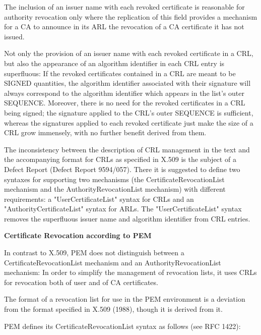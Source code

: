 The inclusion of an issuer name with each revoked certificate is
reasonable for authority revocation only where the replication of this
field provides a mechanism for a CA to announce in its ARL the revocation
of a CA certificate it has not issued.

Not only the provision of an issuer name with each revoked certificate
in a CRL, but also the appearance of an algorithm identifier in each
CRL entry is superfluous: If the revoked certificates contained in a CRL
are meant to be SIGNED quantities, the algorithm identifier associated
with their signature will always correspond to the algorithm identifier
which appears in the list's outer SEQUENCE.
Moreover, there is no need for the revoked certificates in a CRL being
signed; the signature applied to the CRL's outer SEQUENCE is sufficient,
whereas the signatures applied to each revoked certificate just make the
size of a CRL grow immensely, with no further benefit derived from them.

The inconsistency between the description of CRL management in the
text and the accompanying format for CRLs as specified in X.509 is
the subject of a Defect Report (Defect Report 9594/057). There it is
suggested to define two syntaxes for supporting two mechanisms
(the CertificateRevocationList mechanism and the AuthorityRevocationList
mechanism) with different requirements: a "UserCertificateList" syntax
for CRLs and an "AuthorityCertificateList" syntax for ARLs.
The "UserCertificateList" syntax removes the superfluous issuer name
and algorithm identifier from CRL entries.


{\bf Certificate Revocation according to PEM}

In contrast to X.509, PEM does not distinguish between a
CertificateRevocationList mechanism and an AuthorityRevocationList
mechanism: In order to simplify the management of revocation lists,
it uses CRLs for revocation both of user and of CA certificates.

The format of a revocation list for use in the PEM environment is a
deviation from the format specified in X.509 (1988), though it is
derived from it.

PEM defines its CertificateRevocationList syntax as follows (see RFC
1422):

